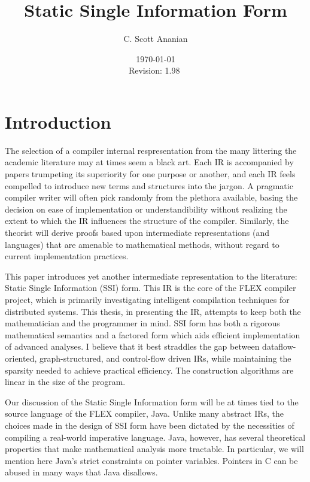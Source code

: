 \documentclass[12pt,titlepage,twoside]{article}
\title{Static Single Information Form
}
\author{C. Scott Ananian}
\date{\today \\ $ $Revision: 1.98 $ $}
\let\oldsection\section
\renewcommand{\section}{\setcounter{figure}{0}\setcounter{table}{0}\oldsection}
\begin{document}


\pagestyle{empty}
\maketitle\cleardoublepage
\pagestyle{myheadings}
\tableofcontents\listoffigures\listoftables\listofalgorithms\cleardoublepage
{}

\section{Introduction}
The selection of a compiler internal respresentation from the many
littering the academic literature may at times seem a black art.  Each
IR is accompanied by papers trumpeting its superiority for one purpose
or another, and each IR feels compelled to introduce new terms and
structures into the jargon.  A pragmatic compiler writer will often
pick randomly from the plethora available, basing the decision on ease
of implementation or understandibility without realizing the extent to
which the IR influences the structure of the compiler.  Similarly, the
theorist will derive proofs based upon intermediate representations
(and languages) that are amenable to mathematical methods, without
regard to current implementation practices.%

This paper introduces yet another intermediate
representation to the literature:  Static Single Information (SSI) form.
This IR is the core of the FLEX compiler project, which is primarily
investigating intelligent compilation techniques for distributed
systems.  This thesis, in presenting the IR,
attempts to keep both the mathematician and the programmer in mind.  
SSI form has both a rigorous mathematical semantics and a factored
form which aids efficient implementation of advanced analyses.
I believe that it best straddles the gap between dataflow-oriented,
graph-structured, and control-flow driven IRs, while maintaining the
sparsity needed to achieve practical efficiency.  The construction
algorithms are linear in the size of the program.

Our discussion of the Static Single Information form will be at times
tied to the source language of the FLEX compiler, Java.  Unlike many
abstract IRs, the choices made in the design of SSI form have been
dictated by the necessities of compiling a real-world imperative
language.  Java, however, has several theoretical properties that make
mathematical analysis more tractable.  In particular, we
will mention here Java's strict constraints on pointer variables.
Pointers in C can be abused in many ways that Java disallows.
\end{document}
